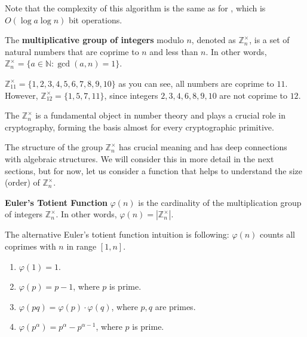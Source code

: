 \documentclass[../lecture-notes-148x210.tex]{subfiles}
\begin{document}
\begin{remark}
    Note that the complexity of this algorithm is the same as for , which is $O(\log a \log n)$ bit operations.
\end{remark}

\begin{definition}
    The \textbf{multiplicative group of integers} modulo $n$, denoted as $\mathbb{Z}_n^{\times}$, is a set of natural numbers that are coprime to $n$ and less than $n$. In other words, $\mathbb{Z}_n^{\times} = \{a \in \mathbb{N}: \gcd(a, n) = 1\}$.
\end{definition}

\begin{example}
    $\mathbb{Z}_{11}^{\times} = \{1, 2, 3, 4, 5, 6, 7, 8, 9, 10\}$ as you can see, 
    all numbers are coprime to $11$.
    However, $\mathbb{Z}_{12}^{\times} = \{1, 5, 7, 11\}$, since 
    integers $2, 3, 4, 6, 8, 9, 10$ are not coprime to $12$. 
\end{example}

The $\mathbb{Z}_{n}^{\times}$ is a fundamental object in number theory and 
plays a crucial role in cryptography, forming the basis almost for every cryptographic primitive.

The structure of the group $\mathbb{Z}_{n}^{\times}$ has crucial meaning and has deep connections 
with algebraic structures. We will consider this in more detail in the next sections, but for now, 
let us consider a function that helps to understand the size (order) of $\mathbb{Z}_{n}^{\times}$. 

\begin{definition} \label{def:euler_totient_function}
    \textbf{Euler's Totient Function} $\varphi(n)$ is the cardinality of the multiplication 
    group of integers $\mathbb{Z}_n^{\times}$. In other words, $\varphi(n) = |\mathbb{Z}_n^{\times}|$.
\end{definition}

\begin{remark}
    The alternative Euler's totient function intuition is following: $\varphi(n)$ counts all coprimes with $n$ in range $[1, n]$. 
\end{remark}

\begin{lemma} 
    \hfill
    \begin{enumerate}
        \item $\varphi(1) = 1$.
        \item $\varphi(p) = p - 1$, where $p$ is prime.
        \item $\varphi(pq) = \varphi(p) \cdot \varphi(q)$, where $p, q$ are primes.
        \item $\varphi(p^{\alpha}) = p^{\alpha} - p^{\alpha - 1}$, where $p$ is prime.        
    \end{enumerate}    
\end{lemma}
\end{document}
